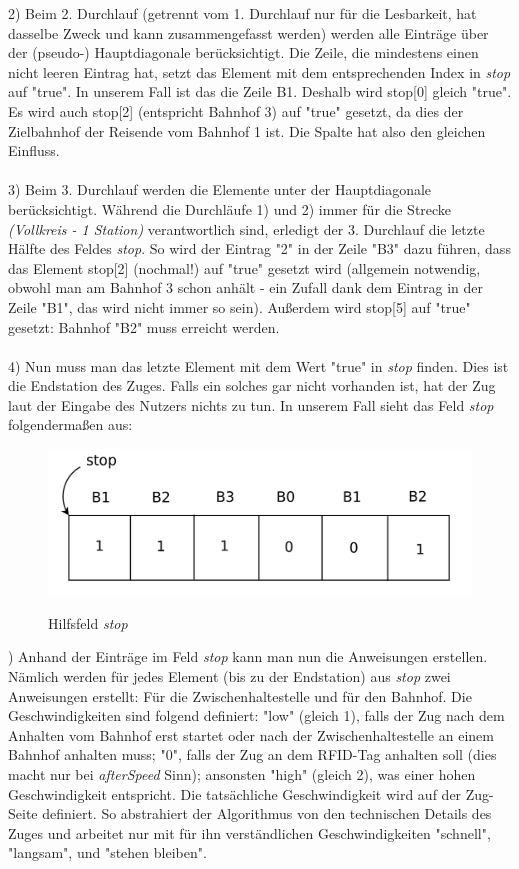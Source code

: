 2) Beim 2. Durchlauf (getrennt vom 1. Durchlauf nur für die Lesbarkeit, hat dasselbe Zweck und kann zusammengefasst werden) werden alle Einträge über der (pseudo-) Hauptdiagonale berücksichtigt. Die Zeile, die mindestens einen nicht leeren Eintrag hat, setzt das Element mit dem entsprechenden Index in \textit{stop} auf "true". In unserem Fall ist das die Zeile B1. Deshalb wird stop[0] gleich "true". Es wird auch stop[2] (entspricht Bahnhof 3) auf "true" gesetzt, da dies der Zielbahnhof der Reisende vom Bahnhof 1 ist. Die Spalte hat also den gleichen Einfluss.\\
\\
3) Beim 3. Durchlauf werden die Elemente unter der Hauptdiagonale berücksichtigt. Während die Durchläufe 1) und 2) immer für die Strecke \textit{(Vollkreis - 1 Station)} verantwortlich sind, erledigt der 3. Durchlauf die letzte Hälfte des Feldes \textit{stop}. So wird der Eintrag "2" in der Zeile "B3" dazu führen, dass das Element stop[2] (nochmal!) auf "true" gesetzt wird (allgemein notwendig, obwohl man am Bahnhof 3 schon anhält - ein Zufall dank dem Eintrag in der Zeile "B1", das wird nicht immer so sein). Außerdem wird stop[5] auf "true" gesetzt: Bahnhof "B2" muss erreicht werden.\\
\\
4) Nun muss man das letzte Element mit dem Wert "true" in \textit{stop} finden. Dies ist die Endstation des Zuges. Falls ein solches gar nicht vorhanden ist, hat der Zug laut der Eingabe des Nutzers nichts zu tun. In unserem Fall sieht das Feld \textit{stop} folgendermaßen aus:\\
\begin{figure}[H]	
\caption{Hilfsfeld \textit{stop}}
\center
\includegraphics[width=2\textwidth, width=290pt]{content/images/stop1.png}
\label{pic:stop1}
\end{figure}
) Anhand der Einträge im Feld \textit{stop} kann man nun die Anweisungen erstellen. Nämlich werden für jedes Element (bis zu der Endstation) aus \textit{stop} zwei Anweisungen erstellt: Für die Zwischenhaltestelle und für den Bahnhof. Die Geschwindigkeiten sind folgend definiert: "low" (gleich 1), falls der Zug nach dem Anhalten vom Bahnhof erst startet oder nach der Zwischenhaltestelle an einem Bahnhof anhalten muss; "0", falls der Zug an dem RFID-Tag anhalten soll (dies macht nur bei \textit{afterSpeed} Sinn); ansonsten "high" (gleich 2), was einer hohen Geschwindigkeit entspricht. Die tatsächliche Geschwindigkeit wird auf der Zug-Seite definiert. So abstrahiert der Algorithmus von den technischen Details des Zuges und arbeitet nur mit für ihn verständlichen Geschwindigkeiten "schnell", "langsam", und "stehen bleiben".\\
